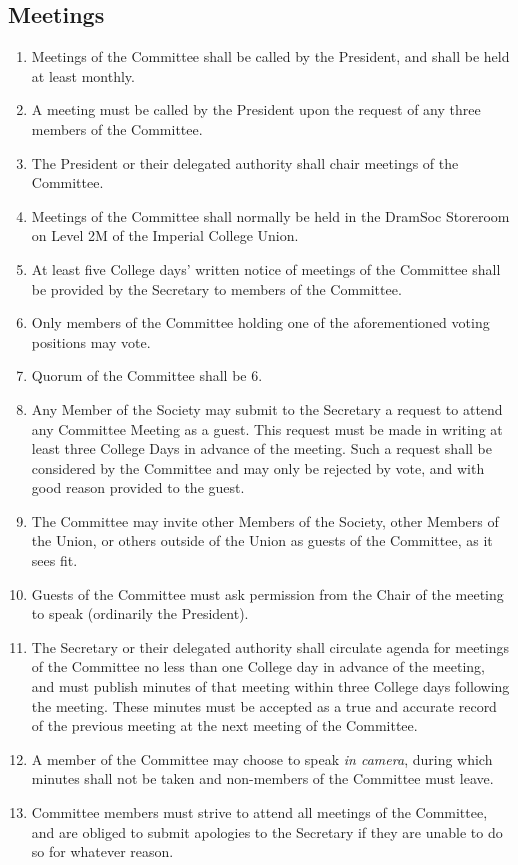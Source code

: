 \documentclass[a4paper]{tufte-handout}
\newcommand{\policyOffset}{12pt}
\newcommand{\policyBye}[2][\policyOffset]{\marginnote[#1]{\textsc{Bye-laws \S#2}}}
\begin{document}
\subsection{Meetings}
\begin{enumerate}[resume]
    \item Meetings of the Committee shall be called by the President, and shall be held at least monthly.
    \item A meeting must be called by the President upon the request of any three members of the Committee.
    \item The President or their delegated authority shall chair meetings of the Committee.
    \item Meetings of the Committee shall normally be held in the DramSoc Storeroom on Level 2M of the Imperial College Union.
    \item At least five College days' written notice of meetings of the Committee shall be provided by the Secretary to members of the Committee.
    \item Only members of the Committee holding one of the aforementioned voting positions may vote.
    \item \policyBye{B11} Quorum of the Committee shall be 6.
    \item Any Member of the Society may submit to the Secretary a request to attend any Committee Meeting as a guest. This request must be made in writing at least three College Days in advance of the meeting. Such a request shall be considered by the Committee and may only be rejected by vote, and with good reason provided to the guest.
    \item The Committee may invite other Members of the Society, other Members of the Union, or others outside of the Union as guests of the Committee, as it sees fit. 
    \item Guests of the Committee must ask permission from the Chair of the meeting to speak (ordinarily the President).
    \item The Secretary or their delegated authority shall circulate agenda for meetings of the Committee no less than one College day in advance of the meeting, and must publish minutes of that meeting within three College days following the meeting. These minutes must be accepted as a true and accurate record of the previous meeting at the next meeting of the Committee.
    \item A member of the Committee may choose to speak \textit{in camera}, during which minutes shall not be taken and non-members of the Committee must leave.
    \item Committee members must strive to attend all meetings of the Committee, and are obliged to submit apologies to the Secretary if they are unable to do so for whatever reason.
\end{enumerate}
\end{document}
